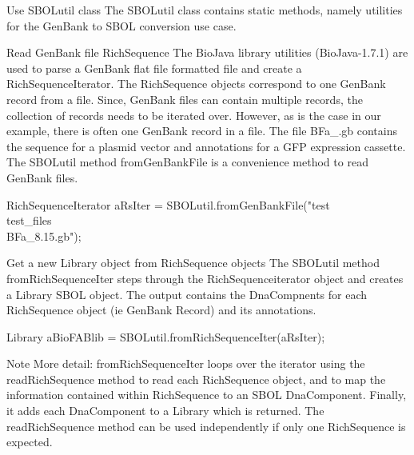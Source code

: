 \begin{DoxyEnumerate}
\item \begin{DoxyParagraph}{Use SBOLutil class}
The SBOLutil class contains static methods, namely utilities for the GenBank to SBOL conversion use case.
\end{DoxyParagraph}

\item \begin{DoxyParagraph}{Read GenBank file RichSequence}
The BioJava library utilities (BioJava-\/1.7.1) are used to parse a GenBank flat file formatted file and create a RichSequenceIterator. The RichSequence objects correspond to one GenBank record from a file. Since, GenBank files can contain multiple records, the collection of records needs to be iterated over. However, as is the case in our example, there is often one GenBank record in a file. The file BFa\_.gb contains the sequence for a plasmid vector and annotations for a GFP expression cassette. The SBOLutil method fromGenBankFile is a convenience method to read GenBank files. \begin{DoxyVerb}
RichSequenceIterator aRsIter = SBOLutil.fromGenBankFile("test\\test_files\\BFa_8.15.gb");
\end{DoxyVerb}

\end{DoxyParagraph}

\item \begin{DoxyParagraph}{Get a new Library object from RichSequence objects}
The SBOLutil method fromRichSequenceIter steps through the RichSequenceiterator object and creates a Library SBOL object. The output contains the DnaCompnents for each RichSequence object (ie GenBank Record) and its annotations. \begin{DoxyVerb}Library aBioFABlib = SBOLutil.fromRichSequenceIter(aRsIter); \end{DoxyVerb}
 
\end{DoxyParagraph}
\begin{DoxyNote}{Note}
More detail: fromRichSequenceIter loops over the iterator using the readRichSequence method to read each RichSequence object, and to map the information contained within RichSequence to an SBOL DnaComponent. Finally, it adds each DnaComponent to a Library which is returned. The readRichSequence method can be used independently if only one RichSequence is expected.
\end{DoxyNote}


\end{DoxyEnumerate}

